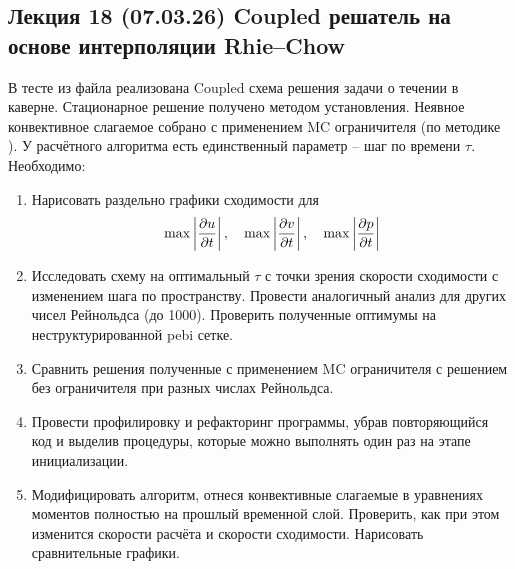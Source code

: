 \subsection{Лекция 18 (07.03.26) Coupled решатель на основе интерполяции Rhie--Chow}
В тесте  из файла 
реализована Coupled схема решения задачи о течении в каверне.
Стационарное решение получено методом установления.
Неявное конвективное слагаемое собрано с применением MC ограничителя (по методике ).
У расчётного алгоритма есть единственный параметр -- шаг по времени $\tau$.
Необходимо:
\begin{enumerate}
\item  Нарисовать раздельно графики сходимости для 
       $$\max\left|\frac{\partial u}{\partial t}\right|,\quad
         \max\left|\frac{\partial v}{\partial t}\right|,\quad
         \max\left|\frac{\partial p}{\partial t}\right|$$
\item  Исследовать схему на оптимальный $\tau$ с точки зрения скорости сходимости с изменением шага по пространству.
       Провести аналогичный анализ для других чисел Рейнольдса (до 1000). Проверить полученные оптимумы на неструктурированной pebi сетке.
\item  Сравнить решения полученные с применением MC ограничителя с решением без ограничителя при разных числах Рейнольдса.
\item  Провести профилировку и рефакторинг программы, убрав повторяющийся код и выделив процедуры, которые можно выполнять один раз на этапе инициализации.
\item  Модифицировать алгоритм, отнеся конвективные слагаемые в уравнениях моментов полностью на прошлый временной слой.
       Проверить, как при этом изменится скорости расчёта и скорости сходимости. Нарисовать сравнительные графики.
\end{enumerate}

